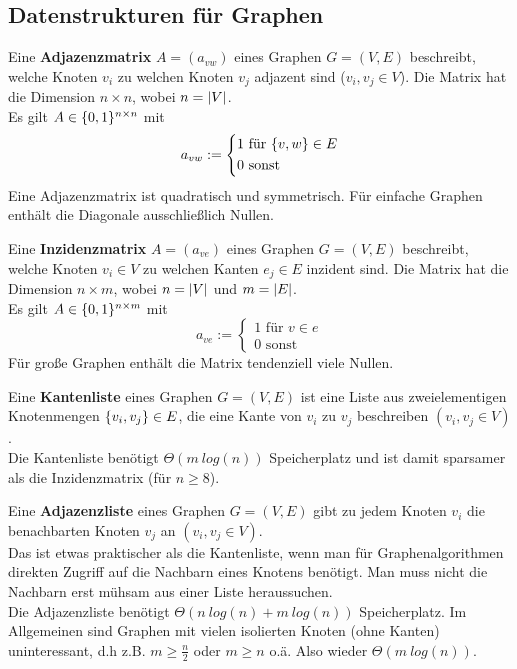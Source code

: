 	\subsection{Datenstrukturen für Graphen}
	\begin{definition}[Adjazenzmatrix]
		Eine \textbf{Adjazenzmatrix} $A = (a_{vw})$ eines Graphen $G = (V, E)$ beschreibt, welche Knoten $v_i$ zu welchen Knoten $v_j$ adjazent sind ($v_i, v_j \in V$). Die Matrix hat die Dimension $n\times n$, wobei $n = \vert V \vert$.\\
		Es gilt $A\in \{0, 1\}^{n\times n}$ mit
		\begin{equation*}
			a_{vw} := \begin{cases*}
				1 \text{ für } \set{v,w} \in E\\
				0 \text{ sonst}
			\end{cases*}
		\end{equation*}
		Eine Adjazenzmatrix ist quadratisch und symmetrisch. Für einfache Graphen enthält die Diagonale ausschließlich Nullen.\\
	\end{definition}
	\begin{definition}[Inzidenzmatrix]
		Eine \textbf{Inzidenzmatrix} $A = (a_{ve})$ eines Graphen $G = (V, E)$ beschreibt, welche Knoten $v_i \in V$ zu welchen Kanten $e_j \in E$ inzident sind. Die Matrix hat die Dimension $n\times m$, wobei $n = \vert V \vert$ und $m = \vert E \vert$.\\
		Es gilt $A\in \{0, 1\}^{n\times m}$ mit
		\begin{equation*}
			a_{ve} := \begin{cases*}
			1 \text{ für } v \in e\\
			0 \text{ sonst}
			\end{cases*}
		\end{equation*}
		Für große Graphen enthält die Matrix tendenziell viele Nullen.
	\end{definition}
	\begin{definition}[Kantenliste]
		Eine \textbf{Kantenliste} eines Graphen $G = (V, E)$ ist eine Liste aus zweielementigen Knotenmengen $\{v_i, v_j\} \in E$, die eine Kante von $v_i$ zu $v_j$ beschreiben $(v_i, v_j \in V)$.\\ Die Kantenliste benötigt $\Theta(m~log(n))$ Speicherplatz und ist damit sparsamer als die Inzidenzmatrix (für $n \ge 8$).
	\end{definition}
	\begin{definition}[Adjazenzliste]
		Eine \textbf{Adjazenzliste} eines Graphen $G = (V, E)$ gibt zu jedem Knoten $v_i$ die benachbarten Knoten $v_j$ an $(v_i, v_j \in V)$.\\
		Das ist etwas praktischer als die Kantenliste, wenn man für Graphenalgorithmen direkten Zugriff auf die Nachbarn eines Knotens benötigt. Man muss nicht die Nachbarn erst mühsam aus einer Liste heraussuchen.\\
		Die Adjazenzliste benötigt $\Theta(n~log(n)+m~log(n))$ Speicherplatz. Im Allgemeinen sind Graphen mit vielen isolierten Knoten (ohne Kanten) uninteressant, d.h z.B. $m\ge \frac{n}{2}$ oder $m\ge n$ o.ä. Also wieder $\Theta(m~log(n))$.
	\end{definition}
	
